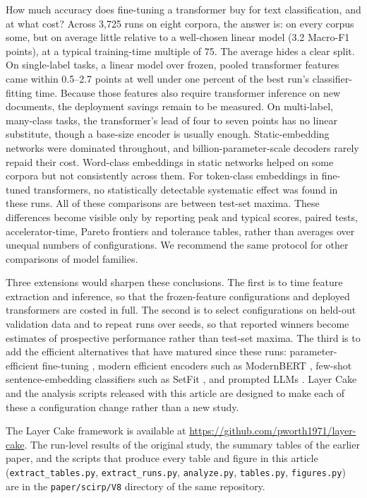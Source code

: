 \documentclass{ijis}
\begin{document}
How much accuracy does fine-tuning a transformer buy for text classification, and at what cost? Across 3,725 runs on eight corpora, the answer is: on every corpus some, but on average little relative to a well-chosen linear model (3.2 Macro-F1 points), at a typical training-time multiple of 75. The average hides a clear split. On single-label tasks, a linear model over frozen, pooled transformer features came within 0.5--2.7 points at well under one percent of the best run's classifier-fitting time. Because those features also require transformer inference on new documents, the deployment savings remain to be measured. On multi-label, many-class tasks, the transformer's lead of four to seven points has no linear substitute, though a base-size encoder is usually enough. Static-embedding networks were dominated throughout, and billion-parameter-scale decoders rarely repaid their cost. Word-class embeddings in static networks helped on some corpora but not consistently across them. For token-class embeddings in fine-tuned transformers, no statistically detectable systematic effect was found in these runs. All of these comparisons are between test-set maxima. These differences become visible only by reporting peak and typical scores, paired tests, accelerator-time, Pareto frontiers and tolerance tables, rather than averages over unequal numbers of configurations. We recommend the same protocol for other comparisons of model families.

Three extensions would sharpen these conclusions. The first is to time feature extraction and inference, so that the frozen-feature configurations and deployed transformers are costed in full. The second is to select configurations on held-out validation data and to repeat runs over seeds, so that reported winners become estimates of prospective performance rather than test-set maxima. The third is to add the efficient alternatives that have matured since these runs: parameter-efficient fine-tuning \cite{hu2021loralowrankadaptationlarge,dettmers2023qloraefficientfinetuningquantized}, modern efficient encoders such as ModernBERT \cite{warner2024modernbert}, few-shot sentence-embedding classifiers such as SetFit \cite{tunstall2022setfit}, and prompted LLMs \cite{edwards2024language}. Layer Cake and the analysis scripts released with this article are designed to make each of these a configuration change rather than a new study.

The Layer Cake framework is available at \url{https://github.com/pworth1971/layer-cake}. The run-level results of the original study, the summary tables of the earlier paper, and the scripts that produce every table and figure in this article (\texttt{extract\_tables.py}, \texttt{extract\_runs.py}, \texttt{analyze.py}, \texttt{tables.py}, \texttt{figures.py}) are in the \texttt{paper/scirp/V8} directory of the same repository.
\end{document}
